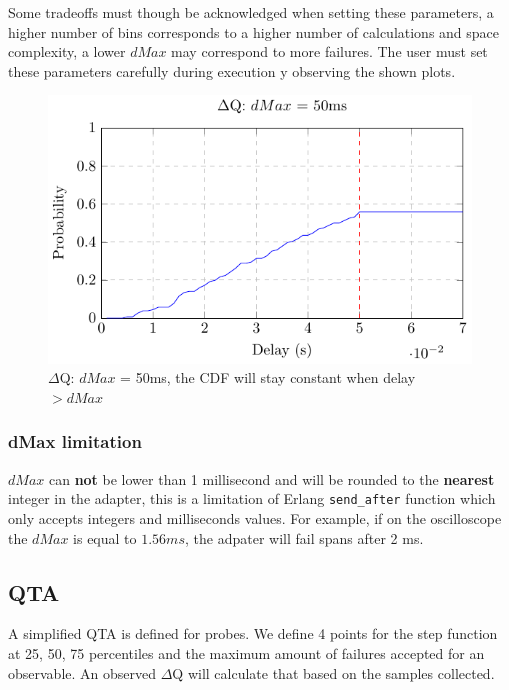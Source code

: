 Some tradeoffs must though be acknowledged when setting these parameters, a higher number of bins corresponds to a higher number of calculations and space complexity, a lower $dMax$ may correspond to more failures. The user must set these parameters carefully during execution y observing the shown plots.

    \begin{figure}[H]
        \begin{center}
            \includegraphics[scale = 1]{tikz/cdf_dmax.pdf}
        \end{center}
        \caption{$\Delta$Q: $dMax$ = 50ms, the CDF will stay constant when delay $> dMax$}
    \end{figure}

    \subsubsection{dMax limitation}
        $dMax$ can \textbf{not} be lower than 1 millisecond and will be rounded to the \textbf{nearest} integer in the adapter, this is a limitation of Erlang \texttt{send\_after} function which only accepts integers and milliseconds values. For example, if on the oscilloscope the $dMax$ is equal to $1.56 ms$, the adpater will fail spans after 2 ms.

    \subsection{QTA}
        A simplified QTA is defined for probes. We define 4 points for the step function at 25, 50, 75 percentiles and the maximum amount of failures accepted for an observable. An observed $\Delta$Q will calculate that based on the samples collected. 

